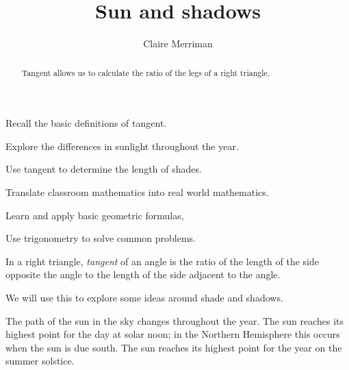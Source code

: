\documentclass[noauthor,nooutcomes,handout,hints]{../ximera}
\title{Sun and shadows} \author{Claire Merriman}
\begin{document}
\begin{abstract}
Tangent allows us to calculate the ratio of the legs of a right triangle.
\end{abstract}
\maketitle

\begin{listOutcomes}
\item  Recall the basic definitions of tangent.
\item Explore the differences in sunlight throughout the year.
\item Use tangent to determine the length of shades.
\item Translate classroom mathematics into real world mathematics.
\end{listOutcomes}

\begin{listObjectives}
 \item Learn and apply basic geometric formulas,
\item Use trigonometry to solve common problems.
\end{listObjectives}


\begin{definition}
 In a right triangle, \emph{tangent} of an angle is the ratio of the length of the side opposite the angle to the length of the side adjacent to the angle. 
\end{definition}
We will use this to explore some ideas around shade and shadows.

The path of the sun in the sky changes throughout the year. The sun reaches its highest point for the day at solar noon; in the Northern Hemisphere this occurs when the sun is due south. The sun reaches its highest point for the year on the summer solstice.

\begin{center}
 
\end{center}
\end{document}
